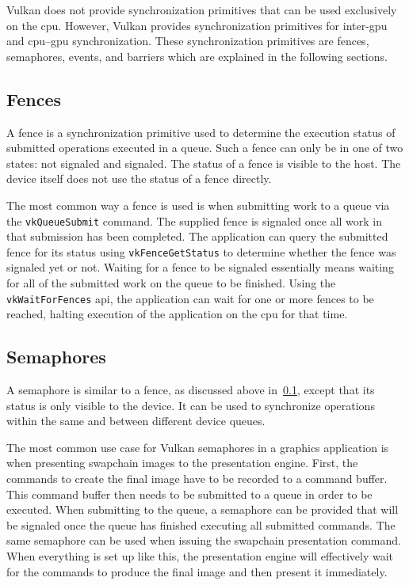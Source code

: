     Vulkan does not provide synchronization primitives that can be used exclusively on the \gls{cpu}.
    However, Vulkan provides synchronization primitives for inter-\gls{gpu} and \gls{cpu}--\gls{gpu} synchronization.
    These synchronization primitives are fences, semaphores, events, and barriers which are explained in the following sections.

    \subsection{Fences}
    \label{sub:Fences}
      A fence is a synchronization primitive used to determine the execution status of submitted operations executed in a queue.
      Such a fence can only be in one of two states: not signaled and signaled.
      The status of a fence is visible to the \gls{host}.
      The device itself does not use the status of a fence directly.

      The most common way a fence is used is when submitting work to a queue via the \lstinline{vkQueueSubmit} command.
      The supplied fence is signaled once all work in that submission has been completed.
      The \gls{application} can query the submitted fence for its status using \lstinline{vkFenceGetStatus} to determine whether the fence was signaled yet or not.
      Waiting for a fence to be signaled essentially means waiting for all of the submitted work on the queue to be finished.
      Using the \lstinline{vkWaitForFences} \gls{api}, the application can wait for one or more fences to be reached, halting execution of the application on the \gls{cpu} for that time.

    \subsection{Semaphores}
    \label{sub:Semaphores}
      A semaphore is similar to a fence, as discussed above in~\ref{sub:Fences}, except that its status is only visible to the device.
      It can be used to synchronize operations within the same and between different device queues.

      The most common use case for Vulkan semaphores in a graphics \gls{application} is when presenting swapchain images to the presentation engine.
      First, the commands to create the final image have to be recorded to a command buffer.
      This command buffer then needs to be submitted to a queue in order to be executed.
      When submitting to the queue, a semaphore can be provided that will be signaled once the queue has finished executing all submitted commands.
      The same semaphore can be used when issuing the swapchain presentation command.
      When everything is set up like this, the presentation engine will effectively wait for the commands to produce the final image and then present it immediately.

